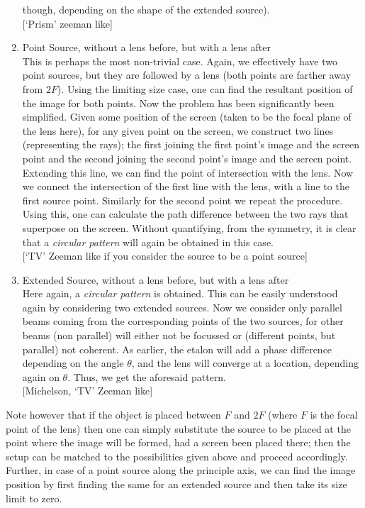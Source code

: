 \begin{enumerate}
though, depending on the shape of the extended source). \\
{[}`Prism' zeeman like{]}
\item Point Source, without a lens before, but with a lens after\\
This is perhaps the most non-trivial case. Again, we effectively have
two point sources, but they are followed by a lens (both points are
farther away from $2F$). Using the limiting size case, one can find
the resultant position of the image for both points. Now the problem
has been significantly been simplified. Given some position of the
screen (taken to be the focal plane of the lens here), for any given
point on the screen, we construct two lines (representing the rays);
the first joining the first point's image and the screen point and
the second joining the second point's image and the screen point.
Extending this line, we can find the point of intersection with the
lens. Now we connect the intersection of the first line with the lens,
with a line to the first source point. Similarly for the second point
we repeat the procedure. Using this, one can calculate the path difference
between the two rays that superpose on the screen. Without quantifying,
from the symmetry, it is clear that a \emph{circular pattern} will
again be obtained in this case. \\
{[}`TV' Zeeman like if you consider the source to be a point source{]}
\item Extended Source, without a lens before, but with a lens after\\
Here again, a \emph{circular pattern} is obtained. This can be easily
understood again by considering two extended sources. Now we consider
only parallel beams coming from the corresponding points of the two
sources, for other beams (non parallel) will either not be focussed
or (different points, but parallel) not coherent. As earlier, the
etalon will add a phase difference depending on the angle $\theta$,
and the lens will converge at a location, depending again on $\theta$.
Thus, we get the aforesaid pattern. \\
{[}Michelson, `TV' Zeeman like{]}
\end{enumerate}
Note however that if the object is placed between $F$ and $2F$ (where
$F$ is the focal point of the lens) then one can simply substitute
the source to be placed at the point where the image will be formed,
had a screen been placed there; then the setup can be matched to the
possibilities given above and proceed accordingly. Further, in case
of a point source along the principle axis, we can find the image
position by first finding the same for an extended source and then
take its size limit to zero.


